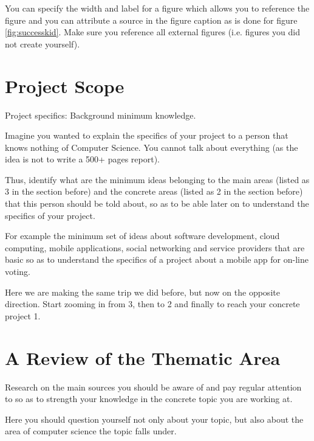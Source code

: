 You can specify the width and label for a figure which allows you to reference the figure and you can attribute a source in the figure caption as is done for figure \ref{fig:successkid}. Make sure you reference all external figures (i.e. figures you did not create yourself).

\section{Project Scope}
Project specifics: Background minimum knowledge.

Imagine you wanted to explain the specifics of your project to a person that knows nothing of Computer Science. You cannot talk about everything (as the idea is not to write a 500+ pages report).

Thus, identify what are the minimum ideas belonging to the main areas (listed as 3 in the section before) and the concrete areas (listed as 2 in the section before) that this person should be told about, so as to be able later on to understand the specifics of your project. 

For example the minimum set of ideas about software development, cloud computing, mobile applications, social networking and service providers that are basic so as to understand the specifics of a project about a mobile app for on-line voting. 

Here we are making the same trip we did before, but now on the opposite direction. Start zooming in from 3, then to 2 and finally to reach your concrete project 1.

\section{A Review of the Thematic Area}
Research on the main sources you should be aware of and pay regular attention to so as to strength your knowledge in the concrete topic you are working at.

Here you should question yourself not only about your topic, but also about the area of computer science the topic falls under. 

